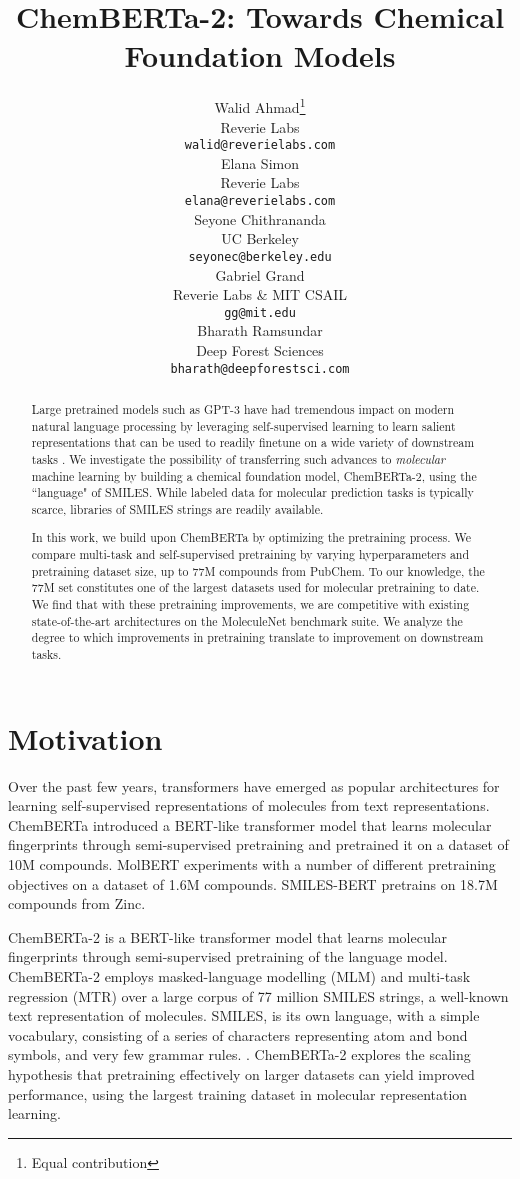 \documentclass{article}
\title{ChemBERTa-2: Towards Chemical Foundation Models}
\author{Walid Ahmad\thanks{Equal contribution} \\
  Reverie Labs \\
  \texttt{walid@reverielabs.com} \\
  \And
  Elana Simon\footnotemark[1] \\
  Reverie Labs \\
  \texttt{elana@reverielabs.com} \\
  \And
  Seyone Chithrananda \\
  UC Berkeley  \\
  \texttt{seyonec@berkeley.edu} \\
  \And
  Gabriel Grand \\
  Reverie Labs \& MIT CSAIL \\
  \texttt{gg@mit.edu} \\
  \And
  Bharath Ramsundar \\
  Deep Forest Sciences \\
  \texttt{bharath@deepforestsci.com} \\
}
\begin{document}
\maketitle
\begin{abstract}
Large pretrained models such as GPT-3 have had tremendous impact on modern natural language processing by leveraging self-supervised learning to learn salient representations that can be used to readily finetune on a wide variety of downstream tasks \cite{bommasani2021opportunities}. We investigate the possibility of transferring such advances to \textit{molecular} machine learning by building a chemical foundation model, ChemBERTa-2, using the ``language" of SMILES. While labeled data for molecular prediction tasks is typically scarce, libraries of SMILES strings are readily available.

In this work, we build upon ChemBERTa \cite{chithrananda2020chemberta} by optimizing the pretraining process. We compare multi-task and self-supervised pretraining by varying hyperparameters and pretraining dataset size, up to 77M compounds from PubChem. To our knowledge, the 77M set constitutes one of the largest datasets used for molecular pretraining to date. We find that with these pretraining improvements, we are competitive with existing state-of-the-art architectures on the MoleculeNet \cite{wu2018moleculenet} benchmark suite. We analyze the degree to which improvements in pretraining translate to improvement on downstream tasks.\end{abstract} 

\section{Motivation}





Over the past few years, transformers \cite{attention, bert} have emerged as popular architectures for learning self-supervised representations of molecules from text representations. ChemBERTa \cite{chithrananda2020chemberta} introduced a BERT-like transformer model that learns molecular fingerprints through semi-supervised pretraining and pretrained it on a dataset of 10M compounds. MolBERT \cite{fabian2020molecular} experiments with a number of different pretraining objectives on a dataset of 1.6M compounds. SMILES-BERT \cite{wang2019smiles} pretrains on 18.7M compounds from Zinc.

ChemBERTa-2 is a BERT-like transformer model \cite{roberta} that learns molecular fingerprints through semi-supervised pretraining of the language model. ChemBERTa-2 employs masked-language modelling (MLM) and multi-task regression (MTR) over a large corpus of 77 million SMILES strings, a well-known text representation of molecules. SMILES, is its own language, with a simple vocabulary, consisting of a series of characters representing atom and bond symbols, and very few grammar rules. \cite{smiles}. ChemBERTa-2 explores the scaling hypothesis that pretraining effectively on larger datasets can yield improved performance, using the largest training dataset in molecular representation learning. 
\end{document}
